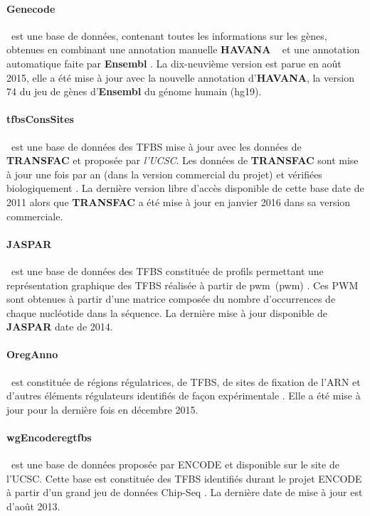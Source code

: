 \paragraph{Genecode} ~est une base de données, contenant toutes les informations sur les gènes, obtenues en combinant une annotation manuelle \textbf{HAVANA} ~\citep{Havana} et une annotation automatique faite par \textbf{Ensembl} \citep{Gencode}. La dix-neuvième version est parue en août 2015, elle a été mise à jour avec la nouvelle annotation d'\textbf{HAVANA}, la version 74 du jeu de gènes d'\textbf{Ensembl} du génome humain (hg19).

\paragraph{tfbsConsSites} ~est une base de données des TFBS mise à jour avec les données de \textbf{TRANSFAC} et proposée par \textit{l'UCSC}\cite{UCSC}. Les données de \textbf{TRANSFAC} sont mise à jour une fois par an (dans la version commercial du projet) et vérifiées biologiquement \citep{Transfac}. La dernière version libre d'accès disponible de cette base date de 2011 alors que \textbf{TRANSFAC} a été mise à jour en janvier 2016 dans sa version commerciale.

\paragraph{JASPAR} ~est une base de données des TFBS  constituée de profils permettant une représentation graphique des TFBS réalisée à partir de \og \acrlong{pwm}\fg ~(\acrshort{pwm}) \citep{Jaspar}. Ces PWM sont obtenues à partir d'une matrice composée du nombre d'occurrences de chaque nucléotide dans la séquence. La dernière mise à jour disponible de \textbf{JASPAR} date de 2014.

\paragraph{OregAnno} ~est constituée de régions régulatrices, de TFBS, de sites de fixation de l'ARN et d'autres éléments régulateurs identifiés de façon expérimentale \citep{Oreg}. Elle a été mise à jour pour la dernière fois en décembre 2015.

\paragraph{wgEncoderegtfbs} ~est une base de données proposée par ENCODE et disponible sur le site de l'UCSC. Cette base est constituée des TFBS identifiés durant le projet ENCODE à partir d'un grand jeu de données Chip-Seq \citep{wgEncode}. La dernière date de mise à jour est d'août 2013.

